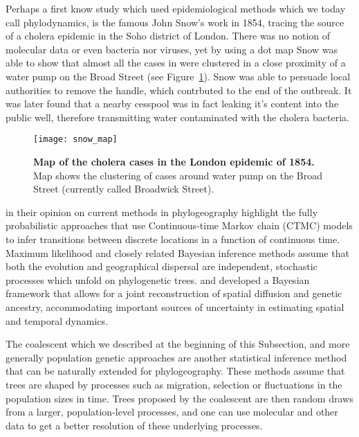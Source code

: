 Perhaps a first know study which used epidemiological methods which we today call phylodynamics, is the famous John Snow's work in 1854, tracing the source of a cholera epidemic in the Soho district of London.
There was no notion of molecular data or even bacteria nor viruses, yet by using a dot map Snow was able to show that almost all the cases in were clustered in a close proximity of a water pump on the Broad Street (see Figure~\ref{fig:snow}).
Snow was able to persuade local authorities to remove the handle, which contrbuted to the end of the outbreak.
It was later found that a nearby cesspool was in fact leaking it's content into the public well, therefore transmitting water contaminated with the cholera bacteria.

\begin{figure}[H]
\centering
\texttt{[image: snow\_map]} 
\caption{
{ \footnotesize 
{\bf Map of the cholera cases in the London epidemic of 1854.} 
Map shows the clustering of cases around water pump on the Broad Street (currently called Broadwick Street).
}%
}
\label{fig:snow}
\end{figure}

\cite{Bloomquist2010} in their opinion on current methods in phylogeography highlight the fully probabilistic approaches that use Continuous-time Markov chain (CTMC) models to infer transitions between discrete locations in a function of continuous time.
Maximum likelihood and closely related Bayesian inference methods assume that both the evolution and geographical dispersal are independent, stochastic processes which unfold on phylogenetic trees.
\cite{Lemey2009} and \cite{Lemey2010} developed a Bayesian framework that allows for a joint reconstruction of spatial diffusion and genetic ancestry, accommodating important sources of uncertainty in estimating spatial and temporal dynamics.

The coalescent which we described at the beginning of this Subsection, and more generally population genetic approaches are another statistical inference method that can be naturally extended for phylogeography.
These methods assume that trees are shaped by processes such as migration, selection or fluctuations in the population sizes in time.
Trees proposed by the coalescent are then random draws from a larger, population-level processes, and one can use molecular and other data to get a better resolution of these underlying processes.

